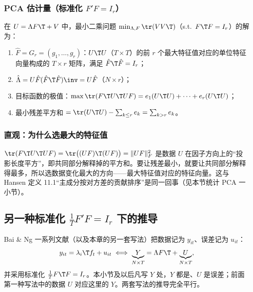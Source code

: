 \subsubsection{PCA 估计量（标准化 \texorpdfstring{$F'F=I_r$}{F'F = I\_r}）}

\begin{thm}[PCA 估计量：标准化 $F\T F=I_r$]\label{thm:U13b-pca1}
在 $U=\Lambda F\T+V$ 中，最小二乘问题 $\min_{\Lambda,F}\tr(VV\T)$（s.t.\ $F\T F=I_r$）的解为：
\begin{enumerate}
\item $\hat F=G_r=(g_1,\dots,g_r)$：$U\T U$（$T\times T$）的前 $r$ 个最大特征值对应的单位特征向量构成的 $T\times r$ 矩阵，满足 $\hat F\T\hat F=I_r$；
\item $\hat\Lambda=U\hat F(\hat F\T\hat F)\inv=U\hat F$（$N\times r$）；
\item 目标函数的极值：$\max\tr(F\T U\T UF)=e_1(U\T U)+\dots+e_r(U\T U)$；
\item 最小残差平方和 $=\tr(U\T U)-\sum_{k\le r}e_k=\sum_{k>r}e_k$。
\end{enumerate}
\end{thm}

\subsubsection{直观：为什么选最大的特征值}

$\tr(F\T U\T UF)=\tr\bigl((UF)\T(UF)\bigr)=\|UF\|_F^2$ 是数据 $U$ 在因子方向上的“投影长度平方”，即共同部分解释掉的平方和。要让残差最小，就要让共同部分解释得最多，所以选数据变化最大的方向——最大特征值对应的特征向量。这与 Hansen 定义 11.1“主成分按对方差的贡献排序”是同一回事（见本节统计 PCA 一小节）。

\subsection{另一种标准化 \texorpdfstring{$\frac1T F'F=I_r$}{F'F/T = I\_r} 下的推导}\label{sec:U13b-norm2}

\begin{note}[记号切换]
Bai \& Ng 一系列文献（以及本章的另一套写法）把数据记为 $y_{it}$、误差记为 $u_{it}$：
\[
y_{it}=\lambda_i\T f_t+u_{it}\iff \underbrace{Y}_{N\times T}=\Lambda F\T+\underbrace{U}_{N\times T},
\]
并采用标准化 $\frac1T F\T F=I_r$。本小节及以后凡写 $Y$ 处，$Y$ 都是、$U$ 是误差；前面第一种写法中的数据 $U$ 对应这里的 $Y$。两套写法的推导完全平行。
\end{note}

